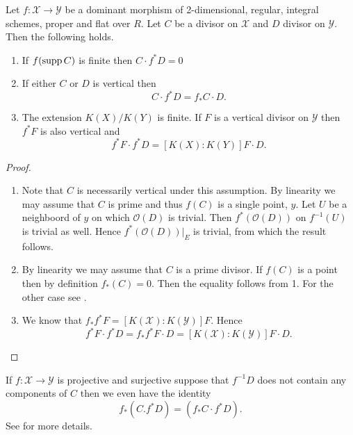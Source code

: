 \begin{theorem}
	Let $f:\mathscr X \to \mathscr Y$ be a dominant morphism of 2-dimensional, regular, integral schemes, proper and flat over $R$. 
	Let $C$ be a divisor on $\mathscr X$ and $D$ divisor on $\mathscr Y$. 
	Then the following holds.
	\begin{enumerate}
		\item If $f(\operatorname{supp} C)$ is finite then $C\cdot f^* D = 0$ 
		\item If either $C$ or $D$ is vertical then \begin{equation}\label{eq:projection_formula}
				C\cdot f^* D = f_* C \cdot D
			.\end{equation}
		\item The extension $K(X) / K(Y)$ is finite. 
			If $F$ is a vertical divisor on $\mathscr Y$ then $f^* F$ is also vertical and \[
				f^* F \cdot f^* D = [K(X): K(Y)] F \cdot D
			.\] 
	\end{enumerate}
\end{theorem}
\begin{proof}
	\begin{enumerate}
		\item Note that $C$ is necessarily vertical under this assumption. 
			By linearity we may assume that $C$ is prime and thus $f(C)$ is a single point, $y$. 
			Let $U$ be a neighboord of  $y$ on which $\mathcal{O}(D)$ is trivial. 
			Then $f^*(\mathcal{O}(D))$ on $f^{-1}(U)$ is trivial as well. 
			Hence $f^*(\mathcal{O}(D))|_E$ is trivial, from which the result follows.
		\item By linearity we may assume that $C$ is a prime divisor.
			If $f(C)$ is a point then by definition $f_*(C) = 0$. Then the equality follows from 1. 
			For the other case see \cite[thm.\ 9.2.12]{liuAlgebraicGeometryArithmetic2002}. 
		\item 
			We know that $f_* f^* F = [K(\mathscr X): K(\mathscr Y)] F$. Hence  \[
				f^* F \cdot  f^* D = f_* f^* F \cdot D = [K(\mathscr X) : K(\mathscr Y)] F \cdot  D
			.\] 

	\end{enumerate}
\end{proof}

\begin{remark}
	If $f: \mathscr X \to \mathscr Y$ is projective and surjective suppose that $f^{-1}D$ does not contain any components of $C$ then we even have the identity  \[
		f_*(C . f^*D) = (f_*C \cdot f^* D)
	.\] 
	See \cite[rem.\ 9.2.13]{liuAlgebraicGeometryArithmetic2002} for more details. 
\end{remark}
